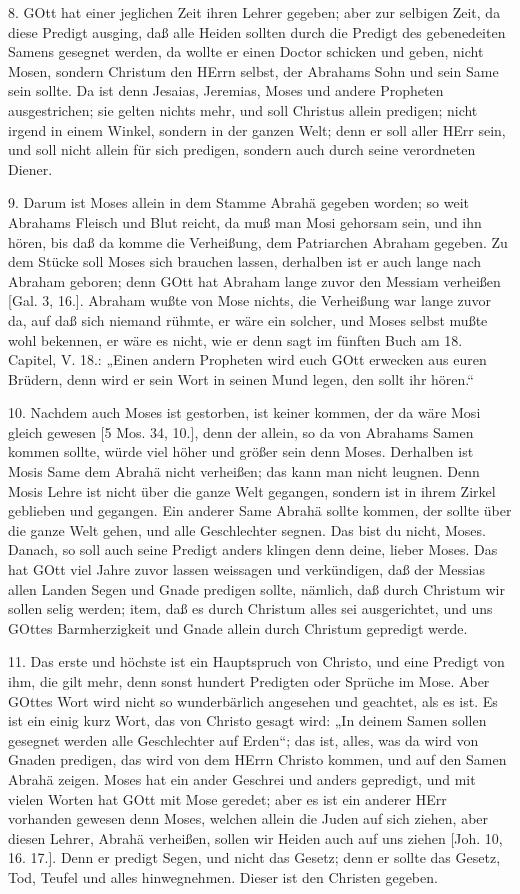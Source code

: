 8. GOtt hat einer jeglichen Zeit ihren Lehrer gegeben; aber zur selbigen Zeit, da diese Predigt ausging, daß alle Heiden sollten durch die Predigt des gebenedeiten Samens gesegnet werden, da wollte er einen Doctor schicken und geben, nicht Mosen, sondern Christum den HErrn selbst, der Abrahams Sohn und sein Same sein sollte. Da ist denn Jesaias, Jeremias, Moses und andere Propheten ausgestrichen; sie gelten nichts mehr, und soll Christus allein predigen; nicht irgend in einem Winkel, sondern in der ganzen Welt; denn er soll aller HErr sein, und soll nicht allein für sich predigen, sondern auch durch seine verordneten Diener.

9. Darum ist Moses allein in dem Stamme Abrahä gegeben worden; so weit Abrahams Fleisch und Blut reicht, da muß man Mosi gehorsam sein, und ihn hören, bis daß da komme die Verheißung, dem Patriarchen Abraham gegeben. Zu dem Stücke soll Moses sich brauchen lassen, derhalben ist er auch lange nach Abraham geboren; denn GOtt hat Abraham lange zuvor den Messiam verheißen [Gal. 3, 16.]. Abraham wußte von Mose nichts, die Verheißung war lange zuvor da, auf daß sich niemand rühmte, er wäre ein solcher, und Moses selbst mußte wohl bekennen, er wäre es nicht, wie er denn sagt im fünften Buch am 18. Capitel, V. 18.: „Einen andern Propheten wird euch GOtt erwecken aus euren Brüdern, denn wird er sein Wort in seinen Mund legen, den sollt ihr hören.“

10. Nachdem auch Moses ist gestorben, ist keiner kommen, der da wäre Mosi gleich gewesen [5 Mos. 34, 10.], denn der allein, so da von Abrahams Samen kommen sollte, würde viel höher und größer sein denn Moses. Derhalben ist Mosis Same dem Abrahä nicht verheißen; das kann man nicht leugnen. Denn Mosis Lehre ist nicht über die ganze Welt gegangen, sondern ist in ihrem Zirkel geblieben und gegangen. Ein anderer Same Abrahä sollte kommen, der sollte über die ganze Welt gehen, und alle Geschlechter segnen. Das bist du nicht, Moses. Danach, so soll auch seine Predigt anders klingen denn deine, lieber Moses. Das hat GOtt viel Jahre zuvor lassen weissagen und verkündigen, daß der Messias allen Landen Segen und Gnade predigen sollte, nämlich, daß durch Christum wir sollen selig werden; item, daß es durch Christum alles sei ausgerichtet, und uns GOttes Barmherzigkeit und Gnade allein durch Christum gepredigt werde.

11. Das erste und höchste ist ein Hauptspruch von Christo, und eine Predigt von ihm, die gilt mehr, denn sonst hundert Predigten oder Sprüche im Mose. Aber GOttes Wort wird nicht so wunderbärlich angesehen und geachtet, als es ist. Es ist ein einig kurz Wort, das von Christo gesagt wird: „In deinem Samen sollen gesegnet werden alle Geschlechter auf Erden“; das ist, alles, was da wird von Gnaden predigen, das wird von dem HErrn Christo kommen, und auf den Samen Abrahä zeigen. Moses hat ein ander Geschrei und anders gepredigt, und mit vielen Worten hat GOtt mit Mose geredet; aber es ist ein anderer HErr vorhanden gewesen denn Moses, welchen allein die Juden auf sich ziehen, aber diesen Lehrer, Abrahä verheißen, sollen wir Heiden auch auf uns ziehen [Joh. 10, 16. 17.]. Denn er predigt Segen, und nicht das Gesetz; denn er sollte das Gesetz, Tod, Teufel und alles hinwegnehmen. Dieser ist den Christen gegeben.

